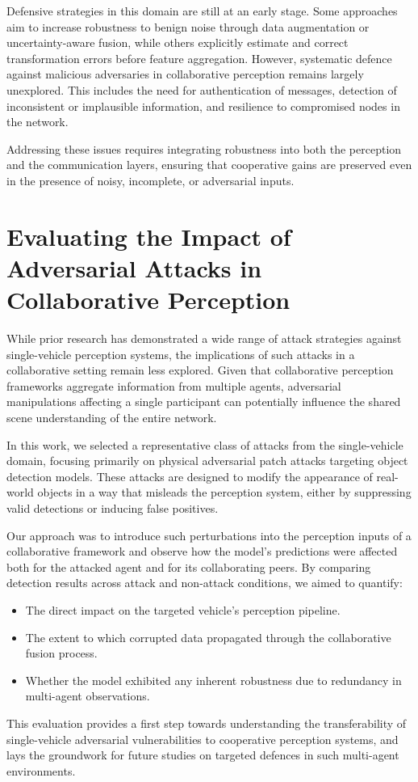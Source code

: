 Defensive strategies in this domain are still at an early stage.
Some approaches aim to increase robustness to benign noise through data augmentation or uncertainty-aware fusion, while others explicitly estimate and correct transformation errors before feature aggregation.
However, systematic defence against malicious adversaries in collaborative perception remains largely unexplored.
This includes the need for authentication of messages, detection of inconsistent or implausible information, and resilience to compromised nodes in the network.

Addressing these issues requires integrating robustness into both the perception and the communication layers, ensuring that cooperative gains are preserved even in the presence of noisy, incomplete, or adversarial inputs.

\section{Evaluating the Impact of Adversarial Attacks in Collaborative Perception}

While prior research has demonstrated a wide range of attack strategies against single-vehicle perception systems, the implications of such attacks in a collaborative setting remain less explored.
Given that collaborative perception frameworks aggregate information from multiple agents, adversarial manipulations affecting a single participant can potentially influence the shared scene understanding of the entire network.

In this work, we selected a representative class of attacks from the single-vehicle domain, focusing primarily on physical adversarial patch attacks targeting object detection models.
These attacks are designed to modify the appearance of real-world objects in a way that misleads the perception system, either by suppressing valid detections or inducing false positives.

Our approach was to introduce such perturbations into the perception inputs of a collaborative framework and observe how the model’s predictions were affected both for the attacked agent and for its collaborating peers.
By comparing detection results across attack and non-attack conditions, we aimed to quantify:

\begin{itemize}
    \item The direct impact on the targeted vehicle’s perception pipeline.
    \item The extent to which corrupted data propagated through the collaborative fusion process.
    \item Whether the model exhibited any inherent robustness due to redundancy in multi-agent observations.
\end{itemize}

This evaluation provides a first step towards understanding the transferability of single-vehicle adversarial vulnerabilities to cooperative perception systems, and lays the groundwork for future studies on targeted defences in such multi-agent environments.

